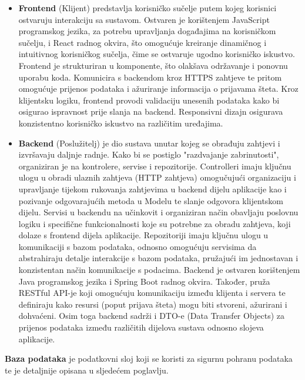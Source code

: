 \begin{itemize}
	\item \textbf{Frontend} (Klijent) predstavlja korisničko sučelje putem kojeg korisnici ostvaruju interakciju sa sustavom. Ostvaren je korištenjem JavaScript programskog jezika, za potrebu upravljanja događajima na korisničkom sučelju, i React radnog okvira, što omogućuje kreiranje dinamičnog i intuitivnog korisničkog sučelja, čime se ostvaruje ugodno korisničko iskustvo. Frontend je strukturiran u komponente, što olakšava održavanje i ponovnu uporabu koda. Komunicira s backendom kroz HTTPS zahtjeve te pritom omogućuje prijenos podataka i ažuriranje informacija o prijavama šteta. Kroz klijentsku logiku, frontend provodi validaciju unesenih podataka kako bi osigurao ispravnost prije slanja na backend. Responsivni dizajn osigurava konzistentno korisničko iskustvo na različitim uređajima.
	\item \textbf{Backend} (Poslužitelj) je dio sustava unutar kojeg se obrađuju zahtjevi i izvršavaju daljnje radnje. Kako bi se postiglo "razdvajanje zabrinutosti", organiziran je na kontrolere, servise i repozitorije. Controlleri imaju ključnu ulogu u obradi ulaznih zahtjeva (HTTP zahtjeva) omogučujući organizaciju i upravljanje tijekom rukovanja zahtjevima u backend dijelu aplikacije kao i pozivanje odgovarajućih metoda u Modelu te slanje odgovora klijentskom dijelu. Servisi u backendu na učinkovit i organiziran način obavljaju poslovnu logiku i specifične funkcionalnosti koje su potrebne za obradu zahtjeva, koji dolaze s frontend dijela aplikacije. Repozitoriji imaju ključnu ulogu u komunikaciji s bazom podataka, odnosno omogućuju servisima da abstrahiraju detalje interakcije s bazom podataka, pružajući im jednostavan i konzistentan način komunikacije s podacima. Backend je ostvaren korištenjem Java programskog jezika i Spring Boot radnog okvira. Također, pruža RESTful API-je koji omogućuju komunikaciju između klijenta i servera te definiraju kako resursi (poput prijava šteta) mogu biti stvoreni, ažurirani i dohvaćeni. Osim toga backend sadrži i DTO-e (Data Transfer Objects) za prijenos podataka između različitih dijelova sustava odnosno slojeva aplikacije.
\end{itemize}

\noindent \textbf{Baza podataka} je podatkovni sloj koji se koristi za sigurnu pohranu podataka te je detaljnije opisana u sljedećem poglavlju.

